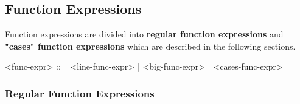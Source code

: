 \documentclass{article}
\begin{document}
\newpage
\subsection{Function Expressions}
\label{subsec:funcexprs}

Function expressions are divided into \textbf{regular function expressions} and
\textbf{"cases" function expressions} which are described in the following
sections.
\begin{grammar}
<func-expr> ::= <line-func-expr> | <big-func-expr> | <cases-func-expr>
\end{grammar}

\subsubsection{Regular Function Expressions}
\end{document}
